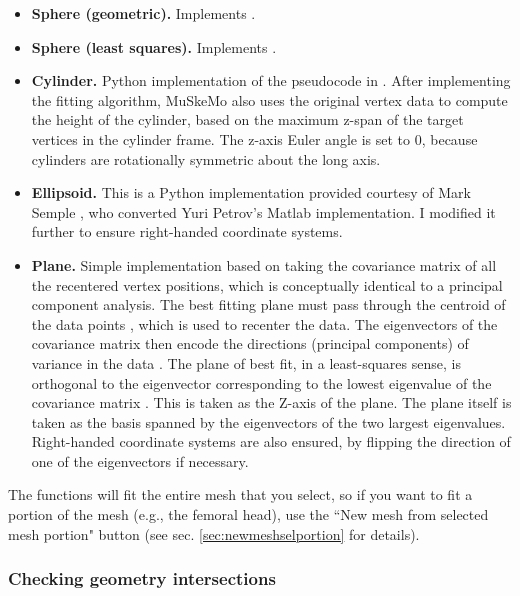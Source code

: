 \documentclass{article}
\begin{document}
\begin{itemize}
    \item \textbf{Sphere (geometric).} Implements \cite{yesudasanFastGeometricFit2015}.
    \item \textbf{Sphere (least squares).} Implements \cite{Jekel2016}.
    \item \textbf{Cylinder.} Python implementation of the pseudocode in \cite{eberlyLeastSquaresFitting}. After implementing the fitting algorithm, MuSkeMo also uses the original vertex data to compute the height of the cylinder, based on the maximum z-span of the target vertices in the cylinder frame. The z-axis Euler angle is set to 0, because cylinders are rotationally symmetric about the long axis.
    \item \textbf{Ellipsoid.} This is a Python implementation provided courtesy of Mark Semple \cite{semplePyEllipsoid_Fit}, who converted Yuri Petrov's Matlab implementation. I modified it further to ensure right-handed coordinate systems.
    \item \textbf{Plane.} Simple implementation based on taking the covariance matrix of all the recentered vertex positions, which is conceptually identical to a principal component analysis. The best fitting plane must pass through the centroid of the data points \cite{pearsonLIIILinesPlanes1901}, which is used to recenter the data. The eigenvectors of the covariance matrix then encode the directions (principal components) of variance in the data \cite{jolliffeMathematicalStatisticalProperties2002}. The plane of best fit, in a least-squares sense, is orthogonal to the eigenvector corresponding to the lowest eigenvalue of the covariance matrix \cite{jolliffeMathematicalStatisticalProperties2002,pearsonLIIILinesPlanes1901}. This is taken as the Z-axis of the plane. The plane itself is taken as the basis spanned by the eigenvectors of the two largest eigenvalues. Right-handed coordinate systems are also ensured, by flipping the direction of one of the eigenvectors if necessary.
\end{itemize}

The functions will fit the entire mesh that you select, so if you want to fit a portion of the mesh (e.g., the femoral head), use the ``New mesh from selected mesh portion" button (see sec. \ref{sec:newmeshselportion} for details).


\subsubsection{Checking geometry intersections}
\label{sec:intersectionchecker}
\end{document}
